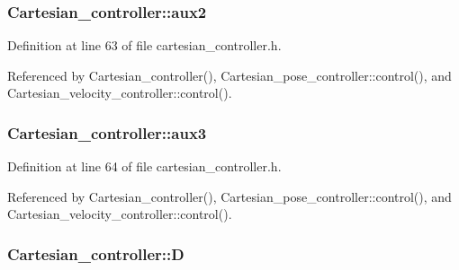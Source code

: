 \hypertarget{classCartesian__controller_af73a0c910cd80ed2f84974b65beba450}{
\subsubsection[{aux2}]{ Cartesian\-\_\-controller\-::aux2\hspace{0.3cm}{\ttfamily [protected]}}}\label{classCartesian__controller_af73a0c910cd80ed2f84974b65beba450}


Definition at line 63 of file cartesian\-\_\-controller.\-h.



Referenced by Cartesian\-\_\-controller(), Cartesian\-\_\-pose\-\_\-controller\-::control(), and Cartesian\-\_\-velocity\-\_\-controller\-::control().

\hypertarget{classCartesian__controller_aa37c15fcd53a60ecce106cd9b39d3501}{
\subsubsection[{aux3}]{ Cartesian\-\_\-controller\-::aux3\hspace{0.3cm}{\ttfamily [protected]}}}\label{classCartesian__controller_aa37c15fcd53a60ecce106cd9b39d3501}


Definition at line 64 of file cartesian\-\_\-controller.\-h.



Referenced by Cartesian\-\_\-controller(), Cartesian\-\_\-pose\-\_\-controller\-::control(), and Cartesian\-\_\-velocity\-\_\-controller\-::control().

\hypertarget{classCartesian__controller_a8c470b652ce436d8e48f126073fc2593}{
\subsubsection[{D}]{ Cartesian\-\_\-controller\-::\-D\hspace{0.3cm}{\ttfamily [protected]}}}\label{classCartesian__controller_a8c470b652ce436d8e48f126073fc2593}


